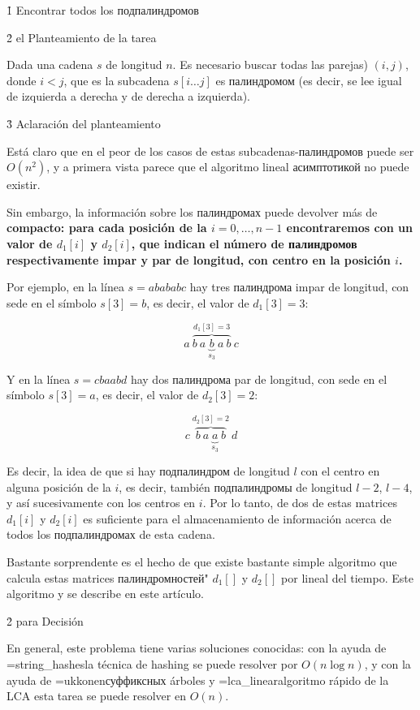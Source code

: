 \h1{ Encontrar todos los подпалиндромов }


\h2{ el Planteamiento de la tarea }

Dada una cadena $s$ de longitud $n$. Es necesario buscar todas las parejas) $(i,j)$, donde $i<j$, que es la subcadena $s[i \ldots j]$ es палиндромом (es decir, se lee igual de izquierda a derecha y de derecha a izquierda).


\h3{ Aclaración del planteamiento }

Está claro que en el peor de los casos de estas subcadenas-палиндромов puede ser $O(n^2)$, y a primera vista parece que el algoritmo lineal асимптотикой no puede existir.

Sin embargo, la información sobre los палиндромах puede devolver más de \bf{compacto}: para cada posición de la $i=0, \ldots, n-1$ encontraremos con un valor de $d_1[i]$ y $d_2[i]$, que indican el número de палиндромов respectivamente impar y par de longitud, con centro en la posición $i$.

Por ejemplo, en la línea $s = abababc$ hay tres палиндрома impar de longitud, con sede en el símbolo $s[3]=b$, es decir, el valor de $d_1[3]=3$:

$$ a\ \overbrace{b\ a\ \underbrace{b}_{s_3}\ a\ b}^{d_1[3]=3}\ c $$

Y en la línea $s = cbaabd$ hay dos палиндрома par de longitud, con sede en el símbolo $s[3]=a$, es decir, el valor de $d_2[3]=2$:

$$ c\ \overbrace{b\ a\ \underbrace{a}_{s_3}\ b}^{d_2[3]=2}\ d $$

Es decir, la idea de que si hay подпалиндром de longitud $l$ con el centro en alguna posición de la $i$, es decir, también подпалиндромы de longitud $l-2$, $l-4$, y así sucesivamente con los centros en $i$. Por lo tanto, de dos de estas matrices $d_1[i]$ y $d_2[i]$ es suficiente para el almacenamiento de información acerca de todos los подпалиндромах de esta cadena.

Bastante sorprendente es el hecho de que existe bastante simple algoritmo que calcula estas matrices палиндромностей" $d_1[]$ y $d_2[]$ por lineal del tiempo. Este algoritmo y se describe en este artículo.


\h2{ para Decisión }

En general, este problema tiene varias soluciones conocidas: con la ayuda de \algohref=string_hashes{la técnica de hashing} se puede resolver por $O (n \log n)$, y con la ayuda de \algohref=ukkonen{суффиксных árboles} y \algohref=lca_linear{algoritmo rápido de la LCA} esta tarea se puede resolver en $O (n)$.

